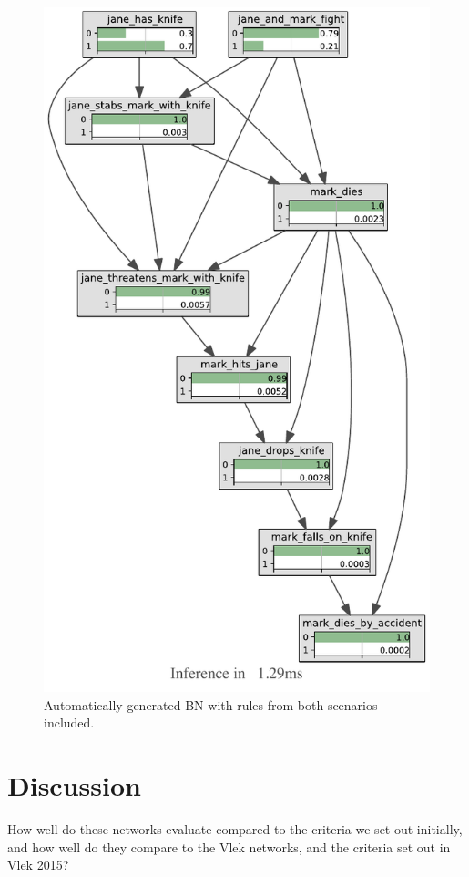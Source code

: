 \begin{figure}[htbp]
\begin{center}
\includegraphics[scale=0.8]{images/Kb.pdf}
\caption{Automatically generated BN with rules from both scenarios included.}
\label{full}
\end{center}
\end{figure}

\section{Discussion}
How well do these networks evaluate compared to the criteria we set out initially, and how well do they compare to the Vlek networks, and the criteria set out in Vlek 2015?





